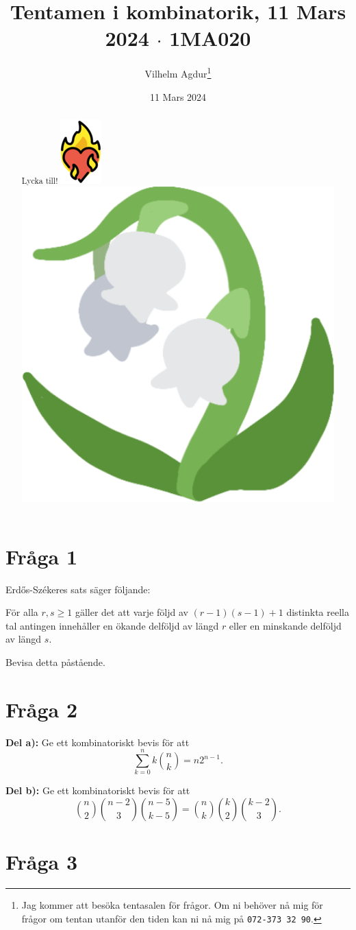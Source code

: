 \documentclass[nobib]{tufte-handout}
\title{Tentamen i kombinatorik, 11 Mars 2024 $\cdot$ 1MA020}
\author[Vilhelm Agdur]{Vilhelm Agdur\thanks{Jag kommer att besöka tentasalen för frågor. Om ni behöver nå mig för frågor om tentan utanför den tiden kan ni nå mig på \texttt{072-373 32 90}.}}
\date{11 Mars 2024}
\begin{document}

\maketitle%

\begin{abstract}
\noindent
Lycka till! {\vspace{0cm}\includegraphics[height=0.08\textwidth]{burning-heart-emoji.png} \includegraphics[height=0.08\textwidth]{lily-emoji.png}}
\end{abstract}

\section{Fråga 1} %

Erd\H{o}s-Székeres sats säger följande:

\begin{theorem}
  För alla $r, s \geq 1$ gäller det att varje följd av $(r-1)(s-1) + 1$ distinkta reella tal antingen innehåller en ökande delföljd av längd $r$ eller en minskande delföljd av längd $s$.
\end{theorem}

Bevisa detta påstående.

\section{Fråga 2} %

\textbf{Del a):} Ge ett kombinatoriskt bevis för att
$$\sum_{k=0}^{n} k\binom{n}{k} = n 2^{n-1}.$$

\noindent\textbf{Del b):} Ge ett kombinatoriskt bevis för att
$$\binom{n}{2}\binom{n-2}{3}\binom{n-5}{k-5} = \binom{n}{k}\binom{k}{2}\binom{k-2}{3}.$$

\section{Fråga 3} %
\end{document}
